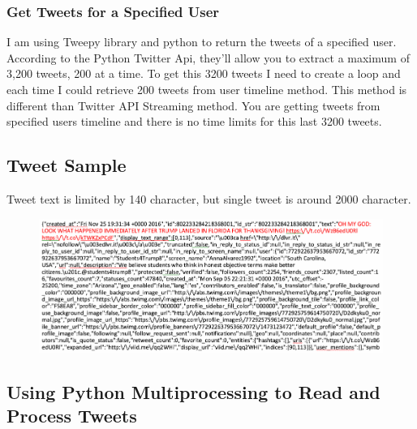 \documentclass[12pt,notitlepage]{article}
\begin{document}
\subsubsection{Get Tweets for a Specified User} 


I am using Tweepy library and python to return the tweets of a specified user. According to the Python Twitter Api, they'll allow you to extract a maximum of 3,200 tweets, 200 at a time. To get this 3200 tweets I need to create a loop and each time I could retrieve 200 tweets from user timeline method. This method is different than Twitter API Streaming method. You are getting tweets from specified users timeline and there is no time limits for this last 3200 tweets.  
\\





\subsection{Tweet Sample} 

Tweet text is limited by 140 character, but single tweet is around 2000 character.

\begin{figure}[htb]
	\centering
	\includegraphics[width=1\linewidth]{TweetSample.pdf}
	\caption{}
	\label{fig:TweetSample}
\end{figure}




\subsection{Using Python Multiprocessing to Read and Process Tweets} 
\end{document}
